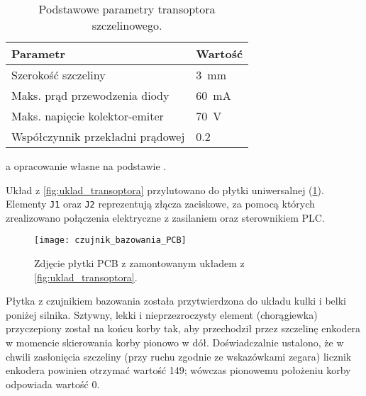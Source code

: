 \begin{table}[h]
    \centering
    \begin{threeparttable}
        \caption{Podstawowe parametry transoptora szczelinowego.}
        \label{tab:parametry_transoptora}
        
        \begin{tabularx}{0.6\textwidth}{l | l}
            \toprule
            Parametr & Wartość \\
            \midrule
            Szerokość szczeliny & \SI{3}{\milli\meter} \\
            Maks. prąd przewodzenia diody & \SI{60}{\milli\ampere} \\
            Maks. napięcie kolektor-emiter & \SI{70}{\volt} \\
            Współczynnik przekładni prądowej & \num{0,2} \\
            \bottomrule
        \end{tabularx}
        
        \begin{tablenotes}
            \footnotesize
            \item[a] opracowanie własne na podstawie \cite{TRANSOPTOR_MANUAL}.
        \end{tablenotes}
    \end{threeparttable}
\end{table}

Układ z \cref{fig:uklad_transoptora} przylutowano do płytki uniwersalnej (\cref{fig:czujnik_bazowania_PCB}). Elementy \texttt{J1} oraz \texttt{J2} reprezentują złącza zaciskowe, za pomocą których zrealizowano połączenia elektryczne z zasilaniem oraz sterownikiem PLC.

\begin{figure}[h]
    \centering
    \texttt{[image: czujnik\_bazowania\_PCB]}
    \caption{Zdjęcie płytki PCB z zamontowanym układem z \cref{fig:uklad_transoptora}.}
    \label{fig:czujnik_bazowania_PCB}
\end{figure}

Płytka z czujnikiem bazowania została przytwierdzona do układu kulki i belki poniżej silnika. Sztywny, lekki i nieprzezroczysty element (chorągiewka) przyczepiony został na końcu korby tak, aby przechodził przez szczelinę enkodera w momencie skierowania korby pionowo w dół. Doświadczalnie ustalono, że w chwili zasłonięcia szczeliny (przy ruchu zgodnie ze wskazówkami zegara) licznik enkodera powinien otrzymać wartość \num{149}; wówczas pionowemu położeniu korby odpowiada wartość \num{0}.

